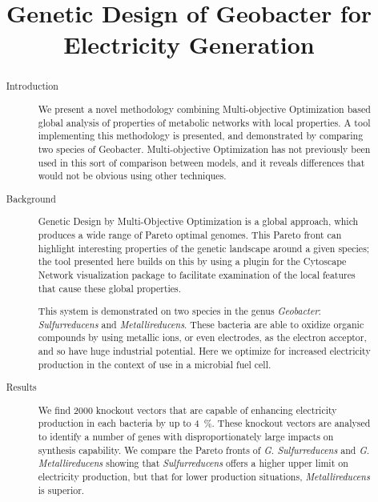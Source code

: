 \documentclass[a4paper]{article}
\begin{document}
\title{Genetic Design of Geobacter for Electricity Generation}
\maketitle
\begin{abstract}
\begin{description}
\item[]

\item[Introduction] 
We present a novel methodology combining Multi-objective Optimization based global analysis of properties of metabolic networks with local properties. A tool implementing this methodology is presented, and demonstrated by comparing two species of Geobacter. Multi-objective Optimization has not previously been used in this sort of comparison between models, and it reveals differences that would not be obvious using other techniques.

\item[Background]
Genetic Design by Multi-Objective Optimization is a global approach, which produces a wide range of Pareto optimal genomes. This Pareto front can highlight interesting properties of the genetic landscape around a given species; the tool presented here builds on this by using a plugin for the Cytoscape Network visualization package to facilitate examination of the local features that cause these global properties.

This system is demonstrated on two species in the genus {\it Geobacter}: {\it Sulfurreducens} and {\it Metallireducens}. These bacteria are able to oxidize organic compounds by using metallic ions, or even electrodes, as the electron acceptor, and so have huge industrial potential. Here we optimize for increased electricity production in the context of use in a microbial fuel cell.

\item[Results]
We find 2000 knockout vectors that are capable of enhancing electricity production in each bacteria by up to \SI{4}{\percent}. These knockout vectors are analysed to identify a number of genes with disproportionately large impacts on synthesis capability. We compare the Pareto fronts of {\it G. Sulfurreducens} and {\it G. Metallireducens} showing that {\it Sulfurreducens} offers a higher upper limit on electricity production, but that for lower production situations, {\it Metallireducens} is superior.


\end{description}
\end{abstract}
\end{document}
